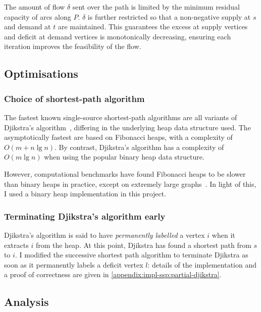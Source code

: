 The amount of flow $\delta$ sent over the path is limited by the minimum residual capacity of arcs along $P$. $\delta$ is further restricted so that a non-negative supply at $s$ and demand at $t$ are maintained. This guarantees the excess at supply vertices and deficit at demand vertices is monotonically decreasing, ensuring each iteration improves the feasibility of the flow.

\subsection{Optimisations} \label{sec:impl-ssp-optimisations}

\subsubsection{Choice of shortest-path algorithm}
The fastest known single-source shortest-path algorithms are all variants of Djikstra's algorithm~\cite[ch.~4]{Ahuja:1993}, differing in the underlying heap data structure used. The asymptotically fastest are based on Fibonacci heaps, with a complexity of $O(m + n\lg n)$. By contrast, Djikstra's algorithm has a complexity of $O(m\lg n)$ when using the popular binary heap data structure\footnotemark.

However, computational benchmarks have found Fibonacci heaps to be slower than binary heaps in practice, except on extremely large graphs~\cite[p.~15]{KiralyKovacs:2012}. In light of this, I used a binary heap implementation in this project.

\subsubsection{Terminating Djikstra's algorithm early}

Djikstra's algorithm is said to have \emph{permanently labelled} a vertex $i$ when it extracts $i$ from the heap. At this point, Djikstra has found a shortest path from $s$ to $i$. I modified the successive shortest path algorithm to terminate Djikstra as soon as it permanently labels a deficit vertex $l$: details of the implementation and a proof of correctness are given in \cref{appendix:impl-ssp:partial-djikstra}.

\subsection{Analysis} \label{sec:impl-ssp-analysis}

